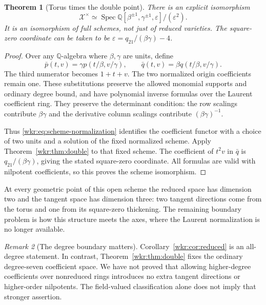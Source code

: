 \documentclass[11pt,a4paper]{article}
\numberwithin{equation}{section}
\newtheorem{theorem}{Theorem}[section]
\theoremstyle{definition}
\theoremstyle{remark}
\newtheorem{remark}[theorem]{Remark}
\newcommand{\Q}{\mathbb{Q}}
\newcommand{\Spec}{\operatorname{Spec}}
\newcommand{\eps}{\varepsilon}
\begin{document}
\begin{theorem}[Torus times the double point]\label{wkr:thm:torusdouble}
There is an explicit isomorphism
\begin{equation}\label{wkr:eq:torusdouble}
\mathcal X^{\times}\simeq
\Spec\Q[\beta^{\pm1},\gamma^{\pm1},\eps]/(\eps^2).
\end{equation}
It is an isomorphism of full schemes, not just of reduced varieties.
The square-zero coordinate can be taken to be
$\eps=q_{21}/(\beta\gamma)-4$.
\end{theorem}
\begin{proof}
Over any $\Q$-algebra where $\beta,\gamma$ are units, define
\begin{equation}\label{wkr:eq:scheme-normalization}
\bar p(t,v)=\gamma p(t/\beta,v/\gamma),\qquad
\bar q(t,v)=\beta q(t/\beta,v/\gamma).
\end{equation}
The third numerator becomes $1+t+v$. The two normalized origin
coefficients remain one. These substitutions preserve the allowed
monomial supports and ordinary degree bound, and have polynomial inverse
formulas over the Laurent coefficient ring. They preserve the determinant
condition: the row scalings contribute $\beta\gamma$ and the derivative
column scalings contribute $(\beta\gamma)^{-1}$.

Thus \eqref{wkr:eq:scheme-normalization} identifies the coefficient functor
with a choice of two units and a solution of the fixed normalized scheme.
Apply Theorem~\ref{wkr:thm:double} to that fixed scheme. The coefficient of
$t^2v$ in $\bar q$ is $q_{21}/(\beta\gamma)$, giving the stated
square-zero coordinate. All formulas are valid with nilpotent
coefficients, so this proves the scheme isomorphism.
\end{proof}

At every geometric point of this open scheme the reduced space has
dimension two and the tangent space has dimension three: two tangent
directions come from the torus and one from its square-zero thickening.
The remaining boundary problem is how this structure meets the axes,
where the Laurent normalization is no longer available.

\begin{remark}[The degree boundary matters]
Corollary~\ref{wkr:cor:reduced} is an all-degree statement. In contrast,
Theorem~\ref{wkr:thm:double} fixes the ordinary degree-seven coefficient space.
We have not proved that allowing higher-degree coefficients over
nonreduced rings introduces no extra tangent directions or higher-order
nilpotents. The field-valued classification alone does not imply that
stronger assertion.
\end{remark}
\end{document}
